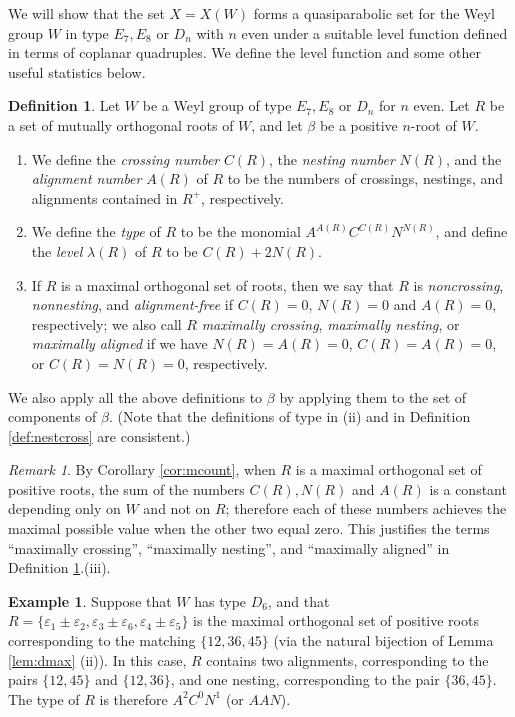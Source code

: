\documentclass[11pt]{amsart}
\theoremstyle{plain}
\theoremstyle{definition}
\newtheorem{defn}[theorem]{Definition}
\newtheorem{exa}[theorem]{Example}
\theoremstyle{remark}
\newtheorem{rmk}[theorem]{Remark}
\numberwithin{equation}{subsection}
\newcommand{\ep}{\varepsilon}
\begin{document}
We will show that the set $X=X(W)$ forms a quasiparabolic set for the Weyl group $W$ in type $E_7,
E_8$ or $D_{n}$ with $n$ even under a suitable level function defined in terms
of coplanar quadruples. We define the level function and some other useful
statistics below.
\begin{defn}\label{def:stats} Let $W$ be a Weyl group of type $E_7, E_8$ or
      $D_{n}$ for $n$ even.  Let $R$ be a set of mutually orthogonal roots of
      $W$, and let $\beta$ be a positive $n$-root of $W$.
      \begin{enumerate}
          \item[(i)] We define the {\it crossing number} $C(R)$, the
               \emph{nesting number} $N(R)$, and the \emph{alignment number}
               $A(R)$ of $R$ to be the numbers of crossings, nestings, and
               alignments contained in $R^+$, respectively.
           \item[(ii)] We define the \emph{type} of $R$ to be the monomial
      $A^{A(R)}C^{C(R)}N^{N(R)}$, and define the {\it level} $\lambda(R)$ of $R$
      to be $C(R) + 2N(R)$.
  \item[(iii)] If $R$ is a maximal orthogonal set of roots, then we say that $R$
      is \emph{noncrossing}, \emph{nonnesting}, and \emph{alignment-free} if
      $C(R)=0$, $N(R)=0$ and $A(R)=0$, respectively; we also call $R$ {\it
      maximally crossing}, {\it maximally nesting}, or {\it maximally aligned}
      if we have $N(R)=A(R)=0$, $C(R)=A(R)=0$, or $C(R)=N(R)=0$, respectively.
\end{enumerate} We also apply all the above definitions to $\beta$ by applying them to
    the set of components of $\beta$. (Note that the
    definitions of type in (ii) and in Definition \ref{def:nestcross} are
consistent.)
\end{defn}

\begin{rmk}
\label{rmk:sum}
By Corollary \ref{cor:mcount}, when $R$ is a maximal orthogonal set of positive
roots, the sum of the numbers $C(R), N(R)$ and $A(R)$ is a constant depending
only on $W$ and not on $R$; therefore each of these numbers achieves the maximal
possible value when the other two equal zero. This justifies the terms
``maximally crossing'', ``maximally nesting'', and ``maximally aligned'' in
Definition \ref{def:stats}.(iii).
\end{rmk}


\begin{exa}\label{exa:type}
Suppose that $W$ has type $D_6$, and that $R=\{\ep_1 \pm
\ep_2,\ep_3\pm\ep_6,\ep_4 \pm \ep_5\}$ is the maximal orthogonal set of positive
roots corresponding to the matching $\{12,36,45\}$ (via the natural bijection of
Lemma \ref{lem:dmax} (ii)). In this case, $R$ contains two alignments,
corresponding to the pairs $\{12,45\}$ and $\{12, 36\}$, and one nesting,
corresponding to the pair $\{36, 45\}$. The type of $R$ is therefore $A^2 C^0
N^1$ (or $AAN$).
\end{exa}
\end{document}
